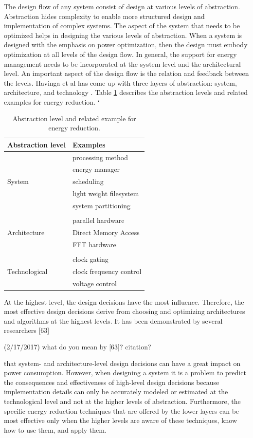 The design flow of any system consist of design at various levels of
abstraction. Abstraction hides complexity to enable more structured
design and implementation of complex systems. The aspect of the
system that needs to be optimized helps in designing the various
levels of abstraction. When a system is designed with the emphasis on
power optimization, then the design must embody optimization at all
levels of the design flow. In general, the support for energy
management needs to be incorporated at the system level and the
architectural level. An important aspect of the design flow is the
relation and feedback between the levels. Havinga et al has come up
with three layers of abstraction: system, architecture, and
technology \cite{havinga, havinga2, havinga3}. Table
\ref{table:abstraction} describes the abstraction levels and related
examples for energy reduction.
`
 \begin{table}
 	\caption{Abstraction level and related example for energy reduction.}
 	\label{table:abstraction}
 	\centering
 	\begin{tabular}{|l|l|}
 		\hline
 		Abstraction level & Examples  \\
 		\hline
 		  & processing method \\
 		  & energy manager \\
 		  System & scheduling \\
 		  & light weight filesystem \\
 		  & system partitioning \\
 		  & \\
 		  & parallel hardware \\
 		  Architecture & Direct Memory Access \\
 		  & FFT hardware \\
 		  &  \\
 		  & clock gating \\
 		  Technological & clock frequency control \\
 		  & voltage control \\
 		\hline
 	\end{tabular}
 \end{table}


At the highest level, the design decisions have the most influence.
Therefore, the most effective design decisions derive from choosing
and optimizing architectures and algorithms at the highest levels. It
has been demonstrated by several researchers [63]
\begin{cmtPai}
	(2/17/2017) what do you mean by [63]? citation?
\end{cmtPai}
that system- and architecture-level design decisions can have a great
impact on power consumption. However, when designing a system it is a
problem to predict the consequences and effectiveness of high-level
design decisions because implementation details can only be
accurately modeled or estimated at the technological level and not at
the higher levels of abstraction. Furthermore, the specific energy
reduction techniques that are offered by the lower layers can be most
effective only when the higher levels are aware of these techniques,
know how to use them, and apply them.
 
